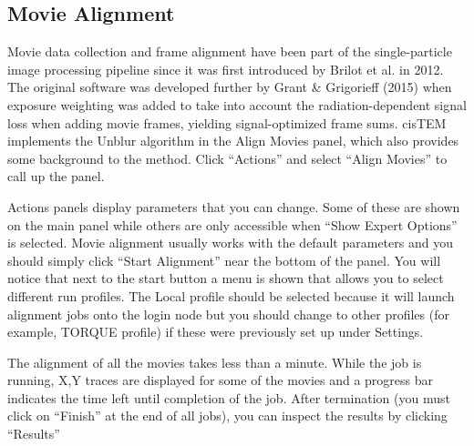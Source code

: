 \documentclass[letterpaper,10pt,english]{sphinxmanual}
\begin{document}


\subsection{Movie Alignment}
\label{\detokenize{cisTEM:movie-alignment}}
Movie data collection and frame alignment have been part of the single-particle image processing pipeline since it was first introduced by Brilot et al. in 2012. The original software  was developed further by Grant \& Grigorieff (2015) when exposure weighting was added to take into account the radiation-dependent signal loss when adding movie frames, yielding signal-optimized frame sums. cisTEM implements the Unblur algorithm in the Align Movies panel, which also provides some background to the method. Click “Actions” and select “Align Movies” to call up the panel.


Actions panels display parameters that you can change. Some of these are shown on the main panel while others are only accessible when “Show Expert Options” is selected.
Movie alignment usually works with the default parameters and you should simply click “Start Alignment” near the bottom of the panel.
You will notice that next to the start button a menu is shown that allows you to select different run profiles.
The Local profile should  be selected because it will launch alignment jobs onto the login node but you should change to other profiles (for example, TORQUE profile)
if these were previously set up under Settings.

The alignment of all the  movies takes less than a minute. While the job is running, X,Y traces are displayed for some of the movies and a progress bar indicates the time left until completion of the job.
After termination (you must click on “Finish” at the end of all jobs), you can inspect the results by clicking “Results”




\renewcommand{\indexname}{Index}
\printindex
\end{document}

